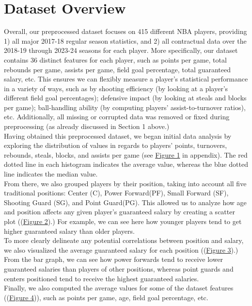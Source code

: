 \documentclass{article}
\begin{document}
\section{Dataset Overview}
Overall, our preprocessed dataset focuses on 415 different NBA players, providing 1) all major 2017-18 regular season statistics, and 2) all contractual data over the 2018-19 through 2023-24 seasons for each player. More specifically, our dataset contains 36 distinct features for each player, such as points per game, total rebounds per game, assists per game, field goal percentage, total guaranteed salary, etc. This ensures we can flexibly measure a player's statistical performance in a variety of ways, such as by shooting efficiency (by looking at a player's different field goal percentages); defensive impact (by looking at steals and blocks per game); ball-handling ability (by computing players' assist-to-turnover ratios), etc. Additionally, all missing or corrupted data was removed or fixed during preprocessing (as already discussed in Section 1 above.)\\
Having obtained this preprocessed dataset, we began initial data analysis by exploring the distribution of values in regards to players' points, turnovers, rebounds, steals, blocks, and assists per game (see \hyperref[sec:Appendix]{Figure 1} in appendix). The red dotted line in each histogram indicates the average value, whereas the blue dotted line indicates the median value.\\
From there, we also grouped players by their position, taking into account all five traditional positions: Center (C), Power Forward(PF), Small Forward (SF), Shooting Guard (SG), and Point Guard(PG). This allowed us to analyze how age and position affects any given player's guaranteed salary by creating a scatter plot ((\hyperref[sec:Appendix]{Figure 2}).) For example, we can see here how younger players tend to get higher guaranteed salary than older players.\\
To more clearly delineate any potential correlations between position and salary, we also visualized the average guaranteed salary for each position ((\hyperref[sec:Appendix]{Figure 3}).) From the bar graph, we can see how power forwards tend to receive lower guaranteed salaries than players of other positions, whereas point guards and centers positioned tend to receive the highest guaranteed salaries.\\
Finally, we also computed the average values for some of the dataset features ((\hyperref[sec:Appendix]{Figure 4})), such as points per game, age, field goal percentage, etc.
\end{document}
